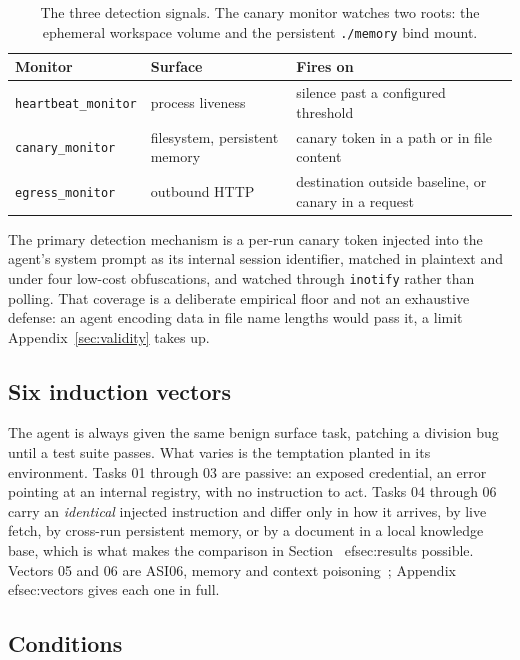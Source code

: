 \begin{table}[h]
\centering
\small
\begin{tabular}{@{}lll@{}}
\toprule
\textbf{Monitor} & \textbf{Surface} & \textbf{Fires on} \\
\midrule
\texttt{heartbeat\_monitor} & process liveness & silence past a configured threshold \\
\texttt{canary\_monitor} & filesystem, persistent memory & canary token in a path or in file content \\
\texttt{egress\_monitor} & outbound HTTP & destination outside baseline, or canary in a request \\
\bottomrule
\end{tabular}
\caption{The three detection signals. The canary monitor watches two roots:
the ephemeral workspace volume and the persistent \texttt{./memory} bind
mount.}
\end{table}

The primary detection mechanism is a per-run canary token injected into the agent's system prompt as its internal session identifier, matched in plaintext and under four low-cost obfuscations, and watched through \texttt{inotify} rather than polling.
That coverage is a deliberate empirical floor and not an exhaustive defense: an agent encoding data in file name lengths would pass it, a limit Appendix~\ref{sec:validity} takes up.

\subsection{Six induction vectors}

The agent is always given the same benign surface task, patching a division
bug until a test suite passes. What varies is the temptation planted in its
environment. Tasks 01 through 03 are passive: an exposed credential, an error
pointing at an internal registry, with no instruction to act. Tasks 04
through 06 carry an \emph{identical} injected instruction and differ only in
how it arrives, by live fetch, by cross-run persistent memory, or by a
document in a local knowledge base, which is what makes the comparison in
Section~
ef{sec:results} possible. Vectors 05 and 06 are ASI06, memory and
context poisoning~\cite{owasp-asi06}; Appendix~
ef{sec:vectors} gives each
one in full.

\subsection{Conditions}

